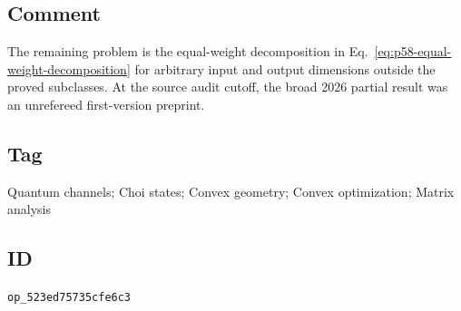 \subsection*{Comment}

The remaining problem is the equal-weight decomposition in
Eq.~\eqref{eq:p58-equal-weight-decomposition} for arbitrary input and output
dimensions outside the proved subclasses.  At the source audit cutoff, the
broad 2026 partial result was an unrefereed first-version preprint.

\subsection*{Tag}

Quantum channels; Choi states; Convex geometry; Convex optimization; Matrix
analysis

\subsection*{ID}

\texttt{op\_523ed75735cfe6c3}
